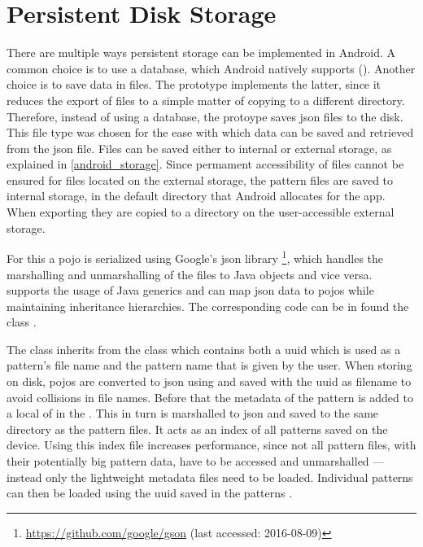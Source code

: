 \section{Persistent Disk Storage}
\label{implementation_storage}
There are multiple ways persistent storage can be implemented in Android. A common choice is to use a  database, which Android natively supports (\cite{android_saving_data}). Another choice is to save data in files. The prototype implements the latter, since it reduces the export of files to a simple matter of copying to a different directory. Therefore, instead of using a database, the protoype saves \gls{json} files to the disk. This file type was chosen for the ease with which data can be saved and retrieved from the \gls{json} file. Files can be saved either to internal or external storage, as explained in \ref{android_storage}. Since permament accessibility of files cannot be ensured for files located on the external storage, the pattern files are saved to internal storage, in the default directory that Android allocates for the app. When exporting they are copied to a directory on the user-accessible external storage. 

For this a  \gls{pojo} is serialized using Google’s \gls{json} library \footnote{\url{https://github.com/google/gson} (last accessed: 2016-08-09)}, which handles the marshalling and unmarshalling of the files to Java objects and vice versa.  supports the usage of Java generics and can map \gls{json} data to \gls{pojo}s while maintaining inheritance hierarchies. The corresponding code can be in found the class .

The  class inherits from the class  which contains both a \gls{uuid} which is used as a pattern's file name and the pattern name that is given by the user. When storing on disk,  \gls{pojo}s are converted to \gls{json} using  and saved with the \gls{uuid} as filename to avoid collisions in file names. Before that the metadata of the pattern is added to a local  of  in the .  This  in turn is marshalled to \gls{json} and saved to the same directory as the pattern files. It acts as an index of all patterns saved on the device. Using this index file increases performance, since not all pattern files, with their potentially big pattern data, have to be accessed and unmarshalled --- instead only the lightweight metadata files need to be loaded. Individual patterns can then be loaded using the \gls{uuid} saved in the patterns .

